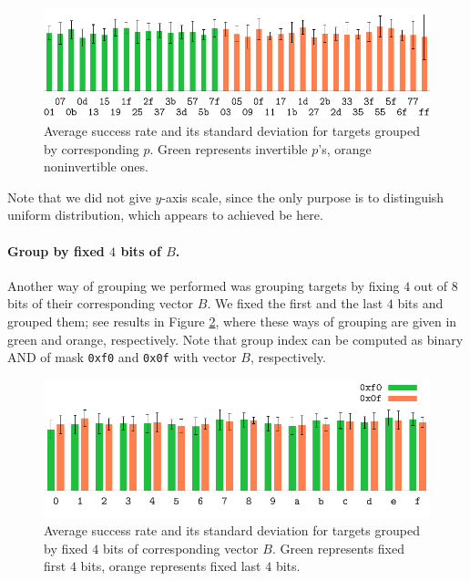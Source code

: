 	\begin{figure}[h]
	\begin{center}
		\includegraphics{figures/leak_target/leak_target.pdf}
		\caption{Average success rate and its standard deviation for targets grouped by corresponding $p$. Green represents invertible $p$'s, orange noninvertible ones.}
		\label{fig:leaktargethist}
	\end{center}
	\end{figure}
	
	Note that we did not give $y$-axis scale, since the only purpose is to distinguish uniform distribution, which appears to achieved be here.
	
	\paragraph{Group by fixed $4$ bits of $B$.}
	
	Another way of grouping we performed was grouping targets by fixing $4$ out of $8$ bits of their corresponding vector $B$. We fixed the first and the last $4$ bits and grouped them; see results in Figure \ref{fig:leaktargetotherhist}, where these ways of grouping are given in green and orange, respectively. Note that group index can be computed as binary AND of mask {\tt 0xf0} and {\tt 0x0f} with vector $B$, respectively.
	
	\begin{figure}[h]
	\begin{center}
		\includegraphics{figures/leak_target_other/leak_0x0f_0xf0.pdf}
		\caption{Average success rate and its standard deviation for targets grouped by fixed $4$ bits of corresponding vector $B$. Green represents fixed first $4$ bits, orange represents fixed last $4$ bits.}
		\label{fig:leaktargetotherhist}
	\end{center}
	\end{figure}
	
